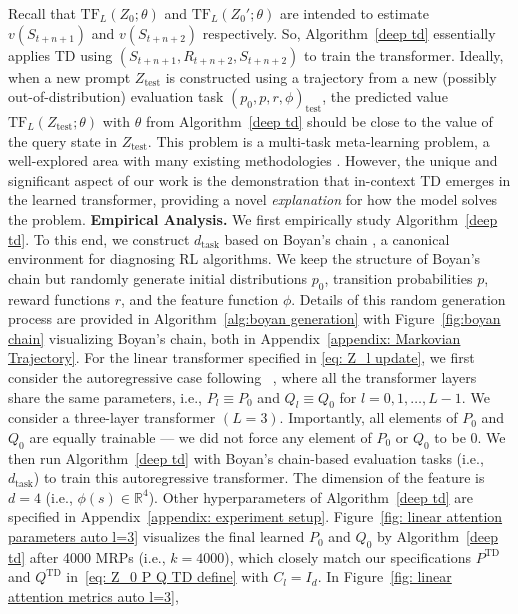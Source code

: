 \documentclass{article}
\newcommand{\R}{\mathbb{R}}
\newcommand{\tb}[1]{{\textbf{#1}}}
\newcommand{\tf}{\text{TF}}
\newcommand{\td}{\text{TD}}
\begin{document}
Recall that $\tf_L(Z_0; \theta)$ and $\tf_L(Z_0'; \theta)$ are intended to estimate $v(S_{t+n+1})$ and $v(S_{t+n+2})$ respectively.
So, Algorithm~\ref{deep td} essentially applies TD using $(S_{t+n+1}, R_{t+n+2}, S_{t+n+2})$ to train the transformer.
Ideally,
when a new prompt $Z_\text{test}$ is constructed using a trajectory from a new (possibly out-of-distribution) evaluation task $(p_0, p, r, \phi)_\text{test}$,
the predicted value $\tf_L(Z_\text{test}; \theta)$ with $\theta$ from Algorithm~\ref{deep td} should be close to the value of the query state in $Z_\text{test}$.
This problem is a multi-task meta-learning problem, a well-explored area with many existing methodologies \citep{beck2023survey}.
However, the unique and significant aspect of our work is the demonstration that in-context TD emerges in the learned transformer, providing a novel \emph{explanation} for how the model solves the problem.
\tb{Empirical Analysis.}
We first empirically study Algorithm~\ref{deep td}.
To this end,
we construct $d_\text{task}$ based on Boyan's chain \citep{boyan1999least},
a canonical environment for diagnosing RL algorithms.
We keep the structure of Boyan's chain but randomly generate initial distributions $p_0$,
transition probabilities $p$, reward functions $r$,
and the feature function $\phi$.
Details of this random generation process are provided in Algorithm~\ref{alg:boyan generation} with Figure~\ref{fig:boyan chain} visualizing Boyan's chain,
both
in Appendix~\ref{appendix: Markovian Trajectory}.
For the linear transformer specified in \eqref{eq: Z_l update}, we first consider the autoregressive case following ~\citep{akyurek2023learning, vonoswald2023transformers},
where all the transformer layers share the same parameters,
i.e., $P_l \equiv P_0$ and $Q_l \equiv Q_0$ for $l=0,1, \dots, L-1$. We consider a three-layer transformer $(L=3)$.
Importantly, all elements of $P_0$ and $Q_0$ are equally trainable ---
we did not force any element of $P_0$ or $Q_0$ to be 0.
We then run Algorithm~\ref{deep td} with Boyan's chain-based evaluation tasks (i.e., $d_\text{task}$) to train this autoregressive transformer.
The dimension of the feature is $d = 4$ (i.e., $\phi(s) \in \R^4$).
Other hyperparameters of Algorithm~\ref{deep td} are specified in Appendix~\ref{appendix: experiment setup}.
Figure~\ref{fig: linear attention parameters auto l=3} visualizes the final
learned $P_0$ and $Q_0$ by Algorithm~\ref{deep td} after 4000 MRPs (i.e., $k=4000$),
which
closely match our specifications $P^{\td}$ and $Q^{\td}$ in~\eqref{eq: Z_0 P Q TD define} with $C_l = I_d$.
In Figure~\ref{fig: linear attention metrics auto l=3},
\end{document}
